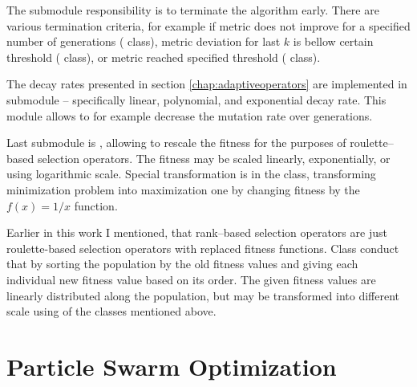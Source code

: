 The  submodule responsibility is to terminate the algorithm early. There are various termination criteria, for example if metric does not improve for a specified number of generations ( class), metric deviation for last $k$ is bellow certain threshold ( class), or metric reached specified threshold ( class).

The decay rates presented in section \ref{chap:adaptiveoperators} are implemented in submodule  -- specifically linear, polynomial, and exponential decay rate. This module allows to for example decrease the mutation rate over generations.

Last submodule is , allowing to rescale the fitness for the purposes of roulette--based selection operators. The fitness may be scaled linearly, exponentially, or using logarithmic scale. Special transformation is in the  class, transforming minimization problem into maximization one by changing fitness by the $f(x)=1/x$ function.

Earlier in this work I mentioned, that rank--based selection operators are just roulette-based selection operators with replaced fitness functions. Class  conduct that by sorting the population by the old fitness values and giving each individual new fitness value based on its order. The given fitness values are linearly distributed along the population, but may be transformed into different scale using of the classes mentioned above.




\section{Particle Swarm Optimization}



